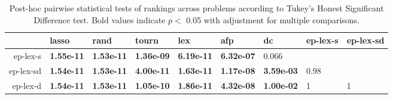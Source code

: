 \begin{table}[ht]
\centering
\caption{Post-hoc pairwise statistical tests of rankings across problems according to Tukey's Honest Significant Difference test. Bold values indicate $p<$ 0.05 with adjustment for multiple comparisons.} 
\label{tbl:hsd}
\begingroup\footnotesize
\begin{tabular}{rllllllll}
  \toprule
 & lasso & rand & tourn & lex & afp & dc & ep-lex-s & ep-lex-sd \\ 
  \midrule
ep-lex-s & {\bf 1.55e-11} & {\bf 1.53e-11} & {\bf 1.36e-09} & {\bf 6.19e-11} & {\bf 6.32e-07} & 0.066 &  &  \\ 
  ep-lex-sd & {\bf 1.54e-11} & {\bf 1.53e-11} & {\bf 4.00e-11} & {\bf 1.63e-11} & {\bf 1.17e-08} & {\bf 3.59e-03} & 0.98 &  \\ 
  ep-lex-d & {\bf 1.54e-11} & {\bf 1.53e-11} & {\bf 1.05e-10} & {\bf 1.86e-11} & {\bf 4.32e-08} & {\bf 1.00e-02} &   1 &   1 \\ 
   \bottomrule
\end{tabular}
\endgroup
\end{table}
